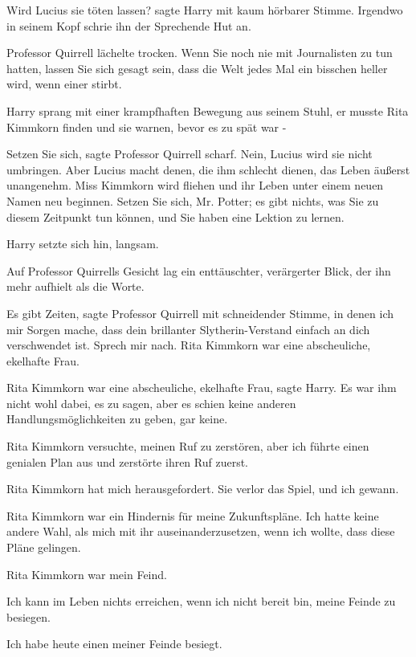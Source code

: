 \glqq Wird Lucius sie töten lassen?\grqq{} sagte Harry mit kaum hörbarer Stimme.
Irgendwo in seinem Kopf schrie ihn der Sprechende Hut an.

Professor Quirrell lächelte trocken. \glqq Wenn Sie noch nie mit Journalisten zu
tun hatten, lassen Sie sich gesagt sein, dass die Welt jedes Mal ein bisschen
heller wird, wenn einer stirbt.\grqq{}

Harry sprang mit einer krampfhaften Bewegung aus seinem Stuhl, er musste Rita
Kimmkorn finden und sie warnen, bevor es zu spät war -

\glqq Setzen Sie sich\grqq{}, sagte Professor Quirrell scharf. \glqq Nein,
Lucius wird sie nicht umbringen. Aber Lucius macht denen, die ihm schlecht
dienen, das Leben äußerst unangenehm. Miss Kimmkorn wird fliehen und ihr Leben
unter einem neuen Namen neu beginnen. Setzen Sie sich, Mr. Potter; es gibt
nichts, was Sie zu diesem Zeitpunkt tun können, und Sie haben eine Lektion zu
lernen.\grqq{}

Harry setzte sich hin, langsam.

Auf Professor Quirrells Gesicht lag ein enttäuschter, verärgerter Blick, der ihn
mehr aufhielt als die Worte.

\glqq Es gibt Zeiten\grqq{}, sagte Professor Quirrell mit schneidender Stimme,
\glqq in denen ich mir Sorgen mache, dass dein brillanter Slytherin-Verstand
einfach an dich verschwendet ist. Sprech mir nach. Rita Kimmkorn war eine
abscheuliche, ekelhafte Frau.\grqq{}

\glqq Rita Kimmkorn war eine abscheuliche, ekelhafte Frau\grqq{}, sagte Harry.
Es war ihm nicht wohl dabei, es zu sagen, aber es schien keine anderen
Handlungsmöglichkeiten zu geben, gar keine.

\glqq Rita Kimmkorn versuchte, meinen Ruf zu zerstören, aber ich führte einen
genialen Plan aus und zerstörte ihren Ruf zuerst.\grqq{}

\glqq Rita Kimmkorn hat mich herausgefordert. Sie verlor das Spiel, und ich
gewann.\grqq{}

\glqq Rita Kimmkorn war ein Hindernis für meine Zukunftspläne. Ich hatte keine
andere Wahl, als mich mit ihr auseinanderzusetzen, wenn ich wollte, dass diese
Pläne gelingen.\grqq{}

\glqq Rita Kimmkorn war mein Feind.\grqq{}

\glqq Ich kann im Leben nichts erreichen, wenn ich nicht bereit bin, meine
Feinde zu besiegen.\grqq{}

\glqq Ich habe heute einen meiner Feinde besiegt.\grqq{}

